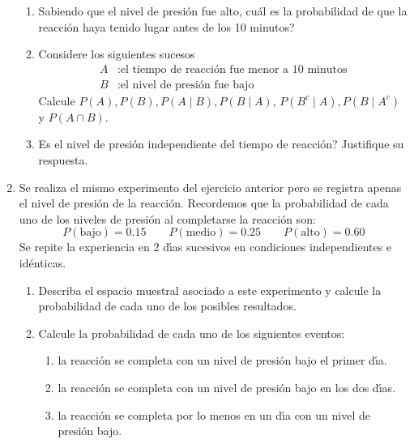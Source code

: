\documentclass[11pt,a4paper,twoside]{article}%
\begin{document}
\begin{enumerate}
\begin{enumerate}
	\item Sabiendo que el nivel de presi\'{o}n fue alto,
	\textquestiondown cu\'{a}l es la probabilidad de que la reacci\'{o}n haya
	tenido lugar antes de los 10 minutos?
	\item Considere los siguientes sucesos\vspace{-0.1cm}
	\begin{align*}
	A  & :\text{el tiempo de reacci\'{o}n fue menor a 10 minutos}\\
	B  & :\text{el nivel de presi\'{o}n fue bajo}%
	\end{align*}
	Calcule $P(A),P(B),P(A\mid B),P(B\mid A)$, $P\left(  B^c \mid A\right)
	,P(B\mid A^{c})$ y $P(A\cap B)$.
	
	\item \textquestiondown Es el nivel de presi\'{o}n independiente del tiempo de
	reacci\'{o}n? Justifique su respuesta.
	
\end{enumerate}




\item Se realiza el mismo experimento del ejercicio anterior pero se registra apenas el nivel de presi\'on de la reacci\'{o}n. Recordemos que la probabilidad de cada uno de los niveles de
presi\'{o}n al completarse la reacci\'{o}n son:\vspace{-0.1cm}%
\[
P(\text{bajo})=0.15\qquad P(\text{medio})=0.25\qquad P(\text{alto})=0.60
\]
Se repite la experiencia en 2 d\'{\i}as sucesivos en condiciones
independientes e id\'{e}nticas.\vspace{-0.2cm}

\begin{enumerate}
	\item Describa el espacio muestral asociado a este experimento y calcule la probabilidad de cada uno de los posibles resultados.
	
	\item Calcule  la probabilidad de cada uno de los siguientes eventos:
	
	\begin{enumerate}
		\item  la reacci\'{o}n se completa con un nivel de presi\'{o}n bajo el primer d\'{\i}a.
		
		\item  la reacci\'{o}n se completa con un nivel de presi\'{o}n bajo en los dos d\'{\i}as.
		
		\item  la reacci\'{o}n se completa por lo menos en un d\'{\i}a con un nivel de presi\'{o}n bajo.
		

\end{enumerate}
\end{enumerate}
\end{enumerate}
\end{document}
